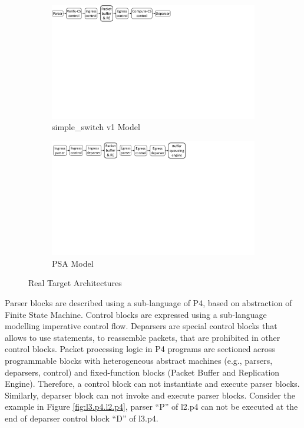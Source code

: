 \documentclass{hotnets19}
\begin{document}
\begin{figure}
    \begin{subfigure}[b]{\linewidth}
        \centering
        \includegraphics[trim=2 460 380 0, clip,scale=0.37]{v1model-pipeline.pdf}
        \caption{simple\_switch v1 Model}
        \label{subfig:v1model}
    \end{subfigure}
    \begin{subfigure}{\linewidth}
        \centering
        \includegraphics[trim=2 450 281 0, clip,scale=0.37]{psa-pipeline.pdf}
        \caption{PSA Model}
        \label{subfig:psa-model}
    \end{subfigure}
\caption{Real Target Architectures}
\label{fig:real-target-architectures}
\end{figure}


Parser blocks are described using a sub-language of P4, based on abstraction of Finite State Machine.
Control blocks are expressed using a sub-language modelling imperative control flow.
Deparsers are special control blocks that allows to use statements, to reassemble packets, that are prohibited in other control blocks.
Packet processing logic in P4 programs are sectioned across programmable blocks with heterogeneous abstract machines (e.g., parsers, deparsers, control) and fixed-function blocks (Packet Buffer and Replication Engine).
Therefore, a control block can not instantiate and execute parser blocks. Similarly, deparser block can not invoke and execute parser blocks.  
Consider the example in Figure \ref{fig:l3.p4.l2.p4}, parser ``P'' of l2.p4 can not be executed at the end of deparser control block ``D'' of l3.p4.
\end{document}

